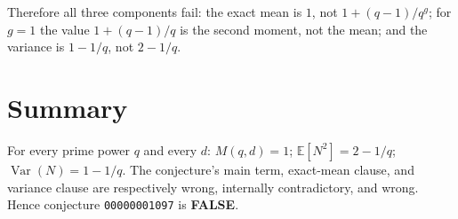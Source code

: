\documentclass[11pt]{article}
\theoremstyle{definition}
\theoremstyle{remark}
\begin{document}
Therefore all three components fail: the exact mean is $1$, not
$1+(q-1)/q^{g}$; for $g=1$ the value $1+(q-1)/q$ is the second moment, not the
mean; and the variance is $1-1/q$, not $2-1/q$.

\section*{Summary}

For every prime power $q$ and every $d$: $M(q,d) = 1$;
$\mathbb{E}[N^2] = 2 - 1/q$; $\operatorname{Var}(N) = 1 - 1/q$. The conjecture's
main term, exact-mean clause, and variance clause are respectively wrong,
internally contradictory, and wrong. Hence conjecture \texttt{00000001097} is
\textbf{FALSE}.
\end{document}
